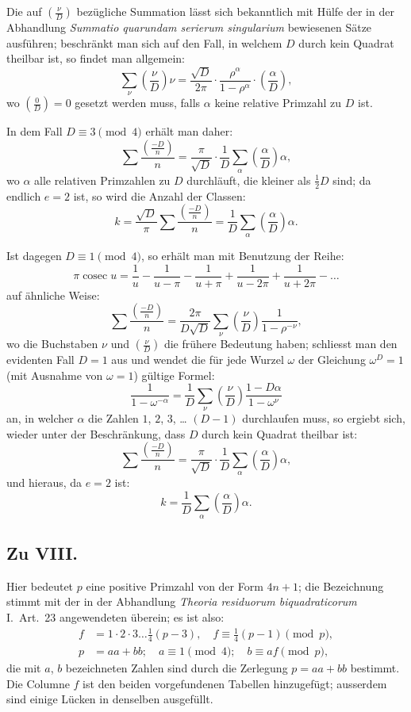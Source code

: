 \documentclass[12pt,a4paper]{article}
\begin{document}
Die auf $\left(\frac{\nu}{D}\right)$ bezügliche Summation lässt sich bekanntlich mit Hülfe der in der Abhandlung
\textit{Summatio quarundam serierum singularium} bewiesenen Sätze ausführen; beschränkt man sich auf
den Fall, in welchem $D$ durch kein Quadrat theilbar ist, so findet man allgemein:
\[
\sum_{\nu} \left(\frac{\nu}{D}\right) \nu = \frac{\sqrt{D}}{2\pi} \cdot \frac{\rho^{\alpha}}{1 - \rho^{\alpha}} \cdot \left(\frac{\alpha}{D}\right),
\]
wo $\left(\frac{0}{D}\right) = 0$ gesetzt werden muss, falls $\alpha$ keine relative Primzahl zu $D$ ist.


In dem Fall $D \equiv 3 \pmod{4}$ erhält man daher:
\[
\sum \frac{\left(\frac{-D}{n}\right)}{n} = \frac{\pi}{\sqrt{D}} \cdot \frac{1}{D} \sum_{\alpha} \left(\frac{\alpha}{D}\right) \alpha,
\]
wo $\alpha$ alle relativen Primzahlen zu $D$ durchläuft, die kleiner als $\frac{1}{2}D$ sind; da endlich $e = 2$ ist, so wird
die Anzahl der Classen:
\[
k = \frac{\sqrt{D}}{\pi} \sum \frac{\left(\frac{-D}{n}\right)}{n} = \frac{1}{D} \sum_{\alpha} \left(\frac{\alpha}{D}\right) \alpha.
\]

Ist dagegen $D \equiv 1 \pmod{4}$, so erhält man mit Benutzung der Reihe:
\[
\pi \operatorname{cosec} u = \frac{1}{u} - \frac{1}{u - \pi} - \frac{1}{u + \pi} + \frac{1}{u - 2\pi} + \frac{1}{u + 2\pi} - \ldots
\]
auf ähnliche Weise:
\[
\sum \frac{\left(\frac{-D}{n}\right)}{n} = \frac{2\pi}{D\sqrt{D}} \sum_{\nu} \left(\frac{\nu}{D}\right) \frac{1}{1 - \rho^{-\nu}},
\]
wo die Buchstaben $\nu$ und $\left(\frac{\nu}{D}\right)$ die frühere Bedeutung haben; schliesst man den evidenten Fall $D = 1$
aus und wendet die für jede Wurzel $\omega$ der Gleichung $\omega^D = 1$ (mit Ausnahme von $\omega = 1$) gültige
Formel:
\[
\frac{1}{1 - \omega^{-\alpha}} = \frac{1}{D} \sum_{\nu} \left(\frac{\nu}{D}\right) \frac{1 - D\alpha}{1 - \omega^{\nu}}
\]
an, in welcher $\alpha$ die Zahlen $1$, $2$, $3$, \ldots{} $(D-1)$ durchlaufen muss, so ergiebt sich, wieder unter der
Beschränkung, dass $D$ durch kein Quadrat theilbar ist:
\[
\sum \frac{\left(\frac{-D}{n}\right)}{n} = \frac{\pi}{\sqrt{D}} \cdot \frac{1}{D} \sum_{\alpha} \left(\frac{\alpha}{D}\right) \alpha,
\]
und hieraus, da $e = 2$ ist:
\[
k = \frac{1}{D} \sum_{\alpha} \left(\frac{\alpha}{D}\right) \alpha.
\]


\subsection*{Zu VIII.}

Hier bedeutet $p$ eine positive Primzahl von der Form $4n + 1$; die Bezeichnung stimmt mit der
in der Abhandlung \textit{Theoria residuorum biquadraticorum} I.~Art.~23 angewendeten überein; es ist also:
\[
\begin{aligned}
f &= 1 \cdot 2 \cdot 3 \ldots \tfrac{1}{4}(p - 3), \quad f \equiv \tfrac{1}{4}(p - 1) \pmod{p},\\
p &= aa + bb; \quad a \equiv 1 \pmod{4}; \quad b \equiv af \pmod{p},
\end{aligned}
\]
die mit $a$, $b$ bezeichneten Zahlen sind durch die Zerlegung $p = aa + bb$ bestimmt.
Die Columne $f$ ist den beiden vorgefundenen Tabellen hinzugefügt; ausserdem sind einige Lücken in
denselben ausgefüllt.
\end{document}
